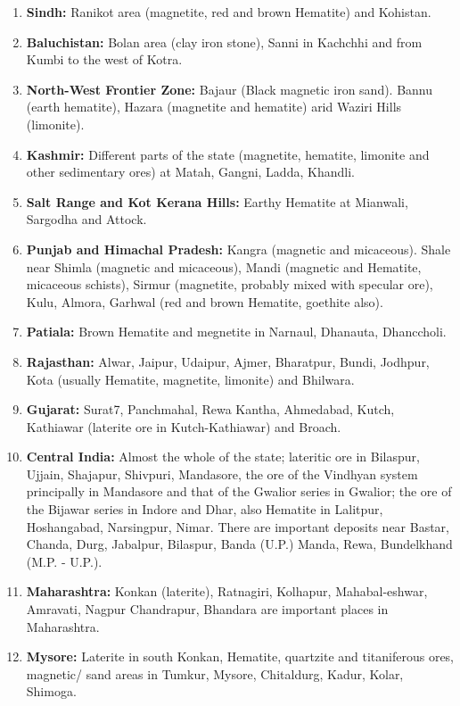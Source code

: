 \begin{enumerate}
\renewcommand{\theenumi}{\arabic{enumi}.}
\renewcommand{\labelenumi}{\bf \theenumi}
\item {\bf Sindh:} Ranikot area (magnetite, red and brown Hematite) and Kohistan.
\item {\bf Baluchistan:} Bolan area (clay iron stone), Sanni in Kachchhi and from Kumbi to the west of Kotra.
\item {\bf North-West Frontier Zone:} Bajaur (Black magnetic iron sand). Bannu (earth hematite), Hazara (magnetite and hematite) arid Waziri Hills (limonite).
\item {\bf Kashmir:} Different parts of the state (magnetite, hematite, limonite and other sedimentary ores) at Matah, Gangni, Ladda, Khandli. 
\item {\bf Salt Range and Kot Kerana Hills:} Earthy Hematite at Mianwali, Sargodha and Attock.
\item {\bf Punjab and Himachal Pradesh:} Kangra (magnetic and micaceous). Shale near  Shimla (magnetic and micaceous), Mandi (magnetic and Hematite, micaceous schists), Sirmur (magnetite, probably mixed with specular ore), Kulu, Almora, Garhwal (red and brown Hematite, goethite also).
\item {\bf Patiala:} Brown Hematite and megnetite in Narnaul, Dhanauta, Dhanccholi.
\item {\bf Rajasthan:} Alwar, Jaipur, Udaipur, Ajmer, Bharatpur, Bundi, Jodhpur, Kota (usually Hematite, magnetite, limonite) and Bhilwara.
\item {\bf Gujarat:} Surat7, Panchmahal, Rewa Kantha, Ahmedabad, Kutch, Kathiawar (laterite ore in Kutch-Kathiawar) and Broach.
\item {\bf  Central India:} Almost the whole of the state; lateritic ore in Bilaspur, Ujjain, Shajapur, Shivpuri, Mandasore, the ore of the Vindhyan system principally in Mandasore and that of the Gwalior series in Gwalior; the ore of the Bijawar series in Indore and Dhar, also Hematite in Lalitpur, Hoshangabad, Narsingpur, Nimar. There are important deposits near Bastar, Chanda, Durg, Jabalpur, Bilaspur, Banda (U.P.) Manda, Rewa, Bundelkhand (M.P. - U.P.).
\item {\bf Maharashtra:} Konkan (laterite), Ratnagiri, Kolhapur, Mahabal-\break eshwar, Amravati, Nagpur Chandrapur, Bhandara are important places in Maharashtra.
\item {\bf Mysore:} Laterite in south Konkan, Hematite, quartzite and titaniferous ores, mag­netic/ sand areas in Tumkur, Mysore, Chitaldurg, Kadur, Kolar, Shimoga.

\end{enumerate}
